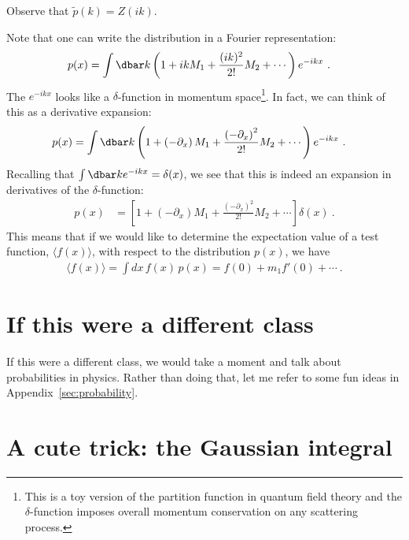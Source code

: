 \begin{example}
Observe that $\tilde p(k) = Z(ik)$.
\end{example}

\begin{example}
Note that one can write the distribution in a Fourier representation:
\begin{align}
	p(x) &= \int \dbar k 
	\left( 1+ikM_1 + \frac{(ik)^2}{2!}M_2 + \cdots \right)e^{-ikx} \ .
\end{align}
The $e^{-ikx}$ looks like a $\delta$-function in momentum space\footnote{This is a toy version of the partition function in quantum field theory and the $\delta$-function imposes overall momentum conservation on any scattering process.}. In fact, we can think of this as a derivative expansion:
\begin{align}
	p(x) &= \int \dbar k \left( 1+ \left(-\partial_x\right) M_1 + \frac{\left(-\partial_x\right)^2}{2!}M_2 + \cdots \right)e^{-ikx} \ .
\end{align}
Recalling that $\int \dbar k e^{-ikx} = \delta(x)$, we see that this is indeed an expansion in derivatives of the $\delta$-function:
\begin{align}
	p(x) &= \left[ 1+ \left(-\partial_x\right) M_1 + \frac{\left(-\partial_x\right)^2}{2!}M_2 + \cdots \right] \delta(x) \ .
\end{align}
This means that if we would like to determine the expectation value of a test function, $\langle f(x)\rangle$, with respect to the distribution $p(x)$, we have
\begin{align}
	\langle f(x)\rangle = \int dx\, f(x)\, p(x) = f(0) + m_1 f'(0) + \cdots \ .
\end{align}
\end{example}



\section{If this were a different class}

If this were a different class, we would take a moment and talk about probabilities in physics. Rather than doing that, let me refer to some fun ideas in Appendix~\ref{sec:probability}.

\section{A cute trick: the Gaussian integral}

